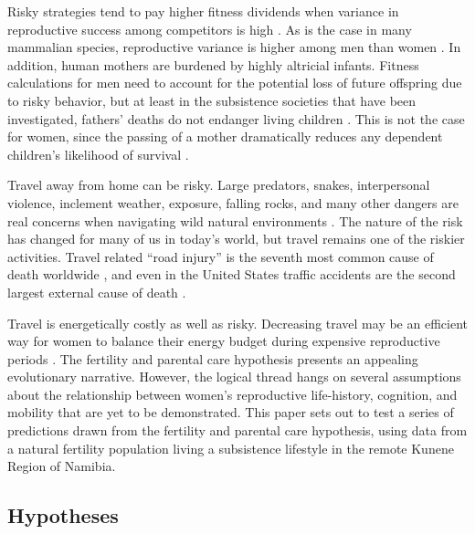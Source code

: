 Risky strategies tend to pay higher fitness dividends when variance in reproductive success among competitors is high \citep{clutton1991sexual, clutton2007sexual, wilson1985competitiveness}.  As is the case in many mammalian species, reproductive variance is higher among men than women \citep{betzig2012means, brown2009bateman}.  In addition, human mothers are burdened by highly altricial infants.  Fitness calculations for men need to account for the potential loss of future offspring due to risky behavior, but at least in the subsistence societies that have been investigated, fathers' deaths do not endanger living children \citep{sear2008keeps}.  This is not the case for women, since the passing of a mother dramatically reduces any dependent children's likelihood of survival \citep{hill1996ache, sear2008keeps}.  


Travel away from home can be risky.  Large predators, snakes, interpersonal violence, inclement weather, exposure, falling rocks, and many other dangers are real concerns when navigating wild natural environments \citep{treves1999risk, pugh1980incidence, walker2001bioarchaeological}.  The nature of the risk has changed for many of us in today's world, but travel remains one of the riskier activities.  Travel related ``road injury'' is the seventh most common cause of death worldwide \citep{krug2000global}, and even in the United States traffic accidents are the second largest external cause of death \citep{sherry2010cdc}.  

Travel is energetically costly as well as risky.  Decreasing travel may be an efficient way for women to balance their energy budget during expensive reproductive periods \citep{dufour2002comparative}.  The fertility and parental care hypothesis presents an appealing evolutionary narrative. However, the logical thread hangs on several assumptions about the relationship between women's reproductive life-history, cognition, and mobility that are yet to be demonstrated.  This paper sets out to test a series of predictions drawn from the fertility and parental care hypothesis, using data from a natural fertility population living a subsistence lifestyle in the remote Kunene Region of Namibia.

	\subsection{Hypotheses}
	\label{sec:1.2}
	
